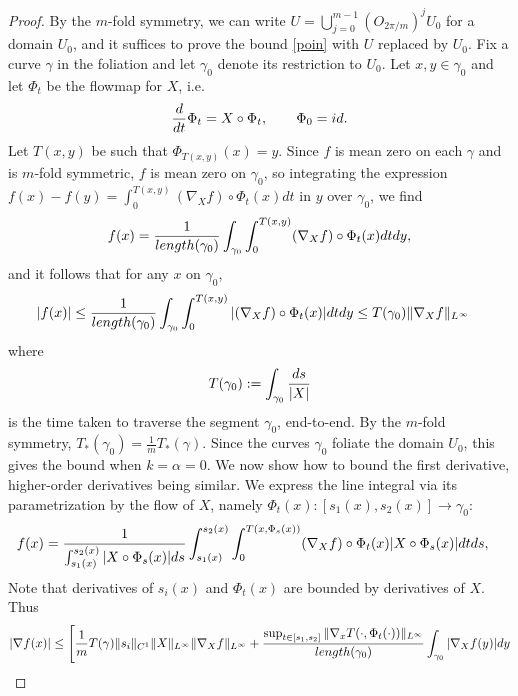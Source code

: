 \documentclass[10pt,a4paper]{amsart}
\newcommand{\be}{\begin{equation}}
\newcommand{\ee}{\end{equation}}
\newcommand{\rmd}{{\rm d}}
\begin{document}
\begin{proof}

    By the $m$-fold symmetry, we can write $U = \bigcup_{j = 0}^{m-1} (O_{2\pi/m})^j U_0$
    for a domain $U_0$, and it suffices
    to prove the bound \eqref{poin} with $U$ replaced by $U_0$. Fix a curve
    $\gamma$ in the foliation and let $\gamma_0$ denote its restriction to $U_0$. Let $x,y\in \gamma_0$ and let $\Phi_t$ be the flowmap for $X$, i.e.
$$
\frac{\rmd }{\rmd t} \Phi_t = X\circ \Phi_t , \qquad \Phi_0={\rm id}.
$$
Let $T(x,y)$ be such that $\Phi_{T(x,y)}(x) = y$. 
Since $f$ is mean zero on each $\gamma$ and is $m$-fold symmetric,
    $f$ is mean zero on $\gamma_0$, so
integrating the expression $f(x)- f(y) =\int_0^{T(x,y)} (\nabla_X  f)\circ \Phi_t(x) d t$
in $y$ over $\gamma_0$, we find
\begin{equation} \label{finvform}
f(x) = \frac{1}{{\rm length}(\gamma_0)}\int_{\gamma_0}\int_0^{T(x,y)} (\nabla_X  f)\circ \Phi_t(x) \rmd t \rmd y,
\end{equation}
and it follows that for any $x$ on $\gamma_0$,
\begin{align*}
|f(x)| \leq \frac{1}{{\rm length}(\gamma_0)}\int_{\gamma_0}\int_0^{T(x,y)} |(\nabla_X  f)\circ \Phi_t(x)| \rmd t \rmd y 
&\leq  T(\gamma_0)\| \nabla_X f\|_{L^\infty}
\end{align*}
where 
\be
T(\gamma_0):=  \int_{\gamma_0} \frac{\rmd s}{|X|}
\ee
is the time taken to traverse the segment $\gamma_0$, end-to-end. By the $m$-fold
symmetry, $T_*(\gamma_0)
= \frac{1}{m}T_*(\gamma)$. Since the curves $\gamma_0$
foliate the domain $U_0$, this gives the bound when
$k = \alpha = 0$. We now show how to bound the first derivative, higher-order derivatives
being similar.  We express the line integral via its parametrization by the flow of $X$, namely $\Phi_t(x):[s_1(x),s_2(x)] \to \gamma_0$:
\begin{align}
f(x) &= \frac{1}{\int_{s_1(x)}^{s_2(x)} |X\circ \Phi_s(x)|  ds}\int_{s_1(x)}^{s_2(x)} \int_0^{T(x,\Phi_s(x))} (\nabla_X  f)\circ \Phi_t(x) |X\circ \Phi_s(x)| \rmd t \rmd s,
\end{align}
Note that derivatives of $s_i(x)$ and $\Phi_t(x)$ are bounded by derivatives of $X$.  Thus
\begin{align*}
|\nabla f(x)| &\leq  \Bigg[\frac{1}{m} T(\gamma) \|s_i\|_{C^1} \|X\|_{L^\infty} \|\nabla_X  f\|_{L^\infty}  +\frac{\sup_{t\in [s_1,s_2]}\|\nabla_x T(\cdot,\Phi_t (\cdot) )\|_{L^\infty}}{{\rm length}(\gamma_0)} \int_{\gamma_0}|\nabla_X  f(y)| d y \\

\end{align*}
\end{proof}
\end{document}
